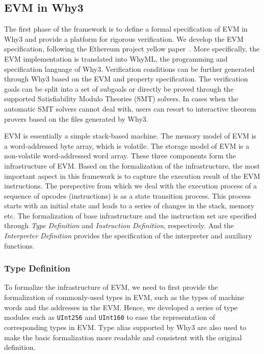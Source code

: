 \documentclass[runningheads]{llncs}
\begin{document}
\subsection{EVM in Why3}
The first phase of the framework is to define a formal specification of EVM in Why3 and provide a platform for rigorous verification.  
We develop the EVM specification, following the Ethereum project yellow paper~\cite{wood2014ethereum}. More specifically, the EVM implementation is translated into WhyML, the programming and specification language of Why3. %
Verification conditions can be further generated through Why3 based on the EVM and property specification. The verification goals can be split into a set of subgoals or directly be proved through the supported Satisfiability Modulo Theories (SMT) solvers. In cases when the automatic SMT solvers cannot deal with, users can resort to interactive theorem provers based on the files generated by Why3.

EVM is essentially a simple stack-based machine. The memory model of EVM is a word-addressed byte array, which is volatile. The storage model of EVM is a non-volatile word-addressed word array. These three components form the infrastructure of EVM. Based on the formalization of the infrastructure, the most important aspect in this framework is to capture the execution result of the EVM instructions. The perspective from which we deal with the execution process of a sequence of opcodes (instructions) is as a state transition process. This process starts with an initial state and leads to a series of changes in the stack, memory etc. The formalization of base infrastructure and the instruction set are specified through \textit{Type Definition} and \textit{Instruction Definition}, respectively. And the \textit{Interpreter Definition} provides the specification of the interpreter and auxiliary functions. 

\subsubsection{Type Definition}\label{sec:type}

To formalize the infrastructure of EVM, we need to first provide the formalization of commonly-used types in EVM, such as the types of machine words and the addresses in the EVM. Hence, we developed a series of type modules such as \texttt{UInt256} and \texttt{UInt160} to ease the representation of corresponding types in EVM. Type alias supported by Why3 are also used to make the basic formalization more readable and consistent with the original definition. 
\end{document}
